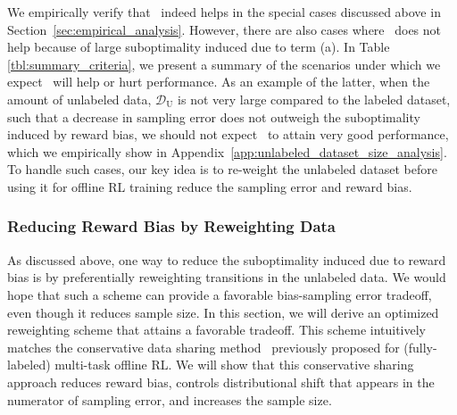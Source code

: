We empirically verify that \uds\ indeed helps in the special cases discussed above in Section~\ref{sec:empirical_analysis}. However, there are also cases where \uds\ does not help because of large suboptimality induced due to term (a). In Table \ref{tbl:summary_criteria}, we present a summary of the scenarios under which we expect \uds\ will help or hurt performance.
As an example of the latter, when the amount of unlabeled data, $\mathcal{D}_\mathrm{U}$ is not very large compared to the labeled dataset, such that a decrease in sampling error does not outweigh the suboptimality induced by reward bias, we should not expect \uds\ to attain very good performance, which we empirically show in Appendix~\ref{app:unlabeled_dataset_size_analysis}. To handle such cases, our key idea is to re-weight the unlabeled dataset before using it for offline RL training reduce the sampling error and reward bias.

\vspace{-0.05cm}
\subsubsection{Reducing Reward Bias by Reweighting Data}
\label{sec:rebalancing}
\vspace{-0.05cm}
As discussed above, one way to reduce the suboptimality induced due to reward bias is by preferentially reweighting transitions in the unlabeled data. We would hope that such a scheme can provide a favorable bias-sampling error tradeoff, even though it reduces sample size. In this section, we will derive an optimized reweighting scheme that attains a favorable tradeoff. 
This scheme intuitively matches the conservative data sharing method~\citet{yu2021conservative} previously proposed for (fully-labeled) multi-task offline RL. We will show that this conservative sharing approach reduces reward bias, controls distributional shift that appears in the numerator of sampling error, and increases the sample size.   

